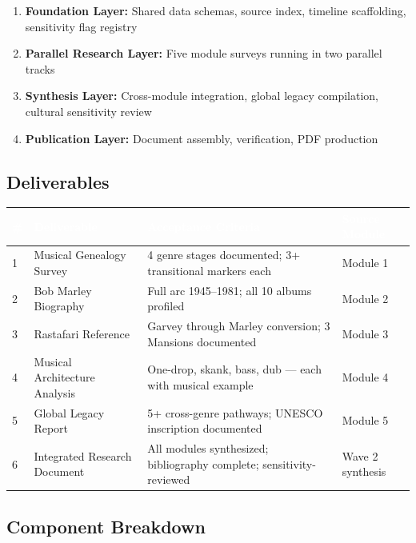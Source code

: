 \documentclass[11pt,letterpaper]{article}
\newcommand{\tableheader}[1]{\textbf{\sffamily\textcolor{white}{#1}}}
\begin{document}
\begin{enumerate}
  \item \textbf{Foundation Layer:} Shared data schemas, source index, timeline scaffolding, sensitivity flag registry
  \item \textbf{Parallel Research Layer:} Five module surveys running in two parallel tracks
  \item \textbf{Synthesis Layer:} Cross-module integration, global legacy compilation, cultural sensitivity review
  \item \textbf{Publication Layer:} Document assembly, verification, PDF production
\end{enumerate}

\subsection{Deliverables}

\begin{center}
\begin{tabularx}{\textwidth}{C{0.5cm}L{3cm}L{5cm}L{5cm}}
\toprule
{}
\tableheader{\#} & \tableheader{Deliverable} & \tableheader{Acceptance Criteria} & \tableheader{Source Module} \\
 & Musical Genealogy Survey & 4 genre stages documented; 3+ transitional markers each & Module 1 \\
2 & Bob Marley Biography & Full arc 1945--1981; all 10 albums profiled & Module 2 \\
3 & Rastafari Reference & Garvey through Marley conversion; 3 Mansions documented & Module 3 \\
4 & Musical Architecture Analysis & One-drop, skank, bass, dub --- each with musical example & Module 4 \\
5 & Global Legacy Report & 5+ cross-genre pathways; UNESCO inscription documented & Module 5 \\
6 & Integrated Research Document & All modules synthesized; bibliography complete; sensitivity-reviewed & Wave 2 synthesis \\
\bottomrule
\end{tabularx}
\end{center}

\subsection{Component Breakdown}
\end{document}
